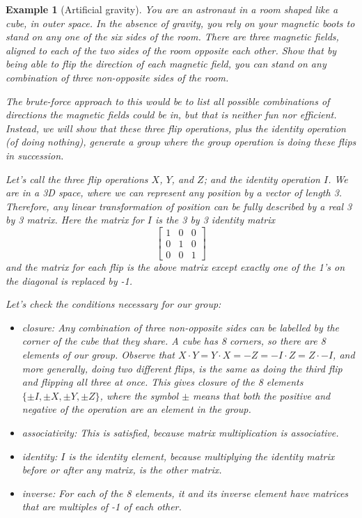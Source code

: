 \documentclass{article}
\newtheorem{example}{Example}
\theoremstyle{definition}
\begin{document}
\begin{example}[Artificial gravity]
	You are an astronaut in a room shaped like a cube, in outer space.  In the absence of gravity, you rely on your magnetic boots to stand on any one of the six sides of the room.  There are three magnetic fields, aligned to each of the two sides of the room opposite each other.  Show that by being able to flip the direction of each magnetic field, you can stand on any combination of three non-opposite sides of the room.
	
	\textnormal{The brute-force approach to this would be to list all possible combinations of directions the magnetic fields could be in, but that is neither fun nor efficient.  Instead, we will show that these three flip operations, plus the identity operation (of doing nothing), generate a group where the group operation is doing these flips in succession.}
	
	\textnormal{Let's call the three flip operations $X$, $Y$, and $Z$; and the identity operation $I$.  We are in a 3D space, where we can represent any position by a vector of length 3.  Therefore, any linear transformation of position can be fully described by a real 3 by 3 matrix.  Here the matrix for $I$ is the 3 by 3 identity matrix}
	\begin{equation*}
		\begin{bmatrix}
			1 & 0 & 0\\
			0 & 1 & 0\\
			0 & 0 & 1
		\end{bmatrix}
	\end{equation*}	
	\textnormal{and the matrix for each flip is the above matrix except exactly one of the 1's on the diagonal is replaced by -1.}
	
	\textnormal{Let's check the conditions necessary for our group:}

	\begin{itemize}
		\item \textit{closure}: \textnormal{Any combination of three non-opposite sides can be labelled by the corner of the cube that they share.  A cube has 8 corners, so there are 8 elements of our group.  Observe that $X \cdot Y = Y \cdot X = -Z = -I \cdot Z = Z \cdot -I$, and more generally, doing two different flips, is the same as doing the third flip and flipping all three at once.  This gives closure of the 8 elements $\{\pm I, \pm X, \pm Y, \pm Z\}$, where the symbol $\pm$ means that both the positive and negative of the operation are an element in the group.}
		\item \textit{associativity}: \textnormal{This is satisfied, because matrix multiplication is associative.}
		\item \textit{identity}: \textnormal{$I$ is the identity element, because multiplying the identity matrix before or after any matrix, is the other matrix.}
		\item \textit{inverse}: \textnormal{For each of the 8 elements, it and its inverse element have matrices that are multiples of -1 of each other.}
	\end{itemize}
\end{example}
\end{document}
